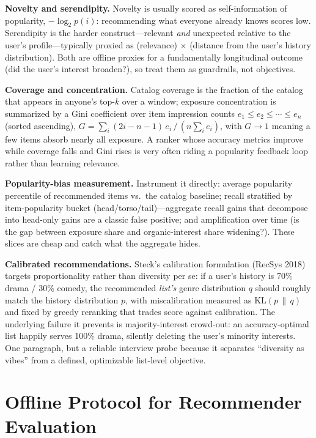 \textbf{Novelty and serendipity.} Novelty is usually scored as self-information of popularity, $-\log_2 p(i)$: recommending what everyone already knows scores low. Serendipity is the harder construct---relevant \textit{and} unexpected relative to the user's profile---typically proxied as (relevance) $\times$ (distance from the user's history distribution). Both are offline proxies for a fundamentally longitudinal outcome (did the user's interest broaden?), so treat them as guardrails, not objectives.

\textbf{Coverage and concentration.} Catalog coverage is the fraction of the catalog that appears in anyone's top-$k$ over a window; exposure concentration is summarized by a Gini coefficient over item impression counts $e_1 \le e_2 \le \cdots \le e_n$ (sorted ascending), $G = \sum_i (2i - n - 1)\, e_i \,/\, (n \sum_i e_i)$, with $G \to 1$ meaning a few items absorb nearly all exposure. A ranker whose accuracy metrics improve while coverage falls and Gini rises is very often riding a popularity feedback loop rather than learning relevance.

\textbf{Popularity-bias measurement.} Instrument it directly: average popularity percentile of recommended items vs.\ the catalog baseline; recall stratified by item-popularity bucket (head/torso/tail)---aggregate recall gains that decompose into head-only gains are a classic false positive; and amplification over time (is the gap between exposure share and organic-interest share widening?). These slices are cheap and catch what the aggregate hides.

\textbf{Calibrated recommendations.} Steck's calibration formulation (RecSys 2018) targets proportionality rather than diversity per se: if a user's history is 70\% drama / 30\% comedy, the recommended \textit{list's} genre distribution $q$ should roughly match the history distribution $p$, with miscalibration measured as $\mathrm{KL}(p \,\|\, q)$ and fixed by greedy reranking that trades score against calibration. The underlying failure it prevents is majority-interest crowd-out: an accuracy-optimal list happily serves 100\% drama, silently deleting the user's minority interests. One paragraph, but a reliable interview probe because it separates ``diversity as vibes'' from a defined, optimizable list-level objective.

\section{Offline Protocol for Recommender Evaluation}
\label{sr:sec:eval_recsys_protocol}

